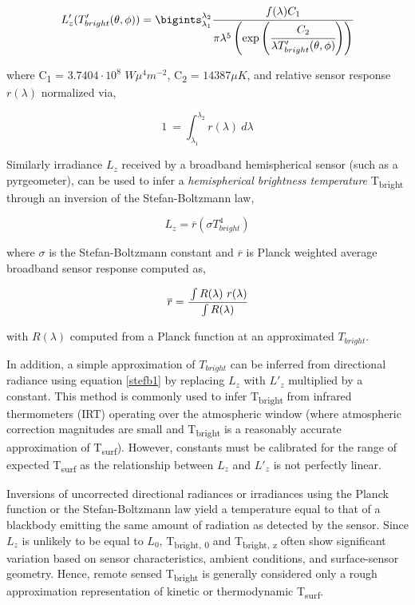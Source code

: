 \begin{equation}
L'_z(T'_{bright} (\theta, \phi)) = \bigints_{\lambda_1}^{\lambda_2} \cfrac{f(\lambda) C_1}{\pi \lambda^5 \left( \exp\left(\cfrac{C_2}{\lambda T'_{bright} (\theta, \phi)}\right)\right)}
\end{equation}

\noindent where C\textsubscript{1} = $ 3.7404 \cdot 10^8 $ $ W\mu^4 m^{-2} $, C\textsubscript{2} = $ 14387 \mu K $, and relative sensor response $ r(\lambda) $ normalized via,

\begin{equation}
1 ~ =  \int_{\lambda_1}^{\lambda_2} r(\lambda) ~ d\lambda
\end{equation}

Similarly irradiance $L_z$ received by a broadband hemispherical sensor (such as a pyrgeometer), can be used to infer a \textit{hemispherical brightness temperature} T\textsubscript{bright} through an inversion of the Stefan-Boltzmann law,

\begin{equation}
\label{stefb1}
L_z = \overline{r} (\sigma T_{bright}^4)
\end{equation}

\noindent where $ \sigma $ is the Stefan-Boltzmann constant and $ \overline{r} $ is Planck weighted average broadband sensor response computed as,

\begin{equation}
\overline{r} = \cfrac{\int R(\lambda) ~ r(\lambda)}{\int R(\lambda)}
\end{equation}

\noindent with $ R(\lambda) $ computed from a Planck function at an approximated $T_{bright}$. 

In addition, a simple approximation of $T_{bright}$ can be inferred from directional radiance using equation \ref{stefb1} by replacing $ L_z $ with $L'_z$ multiplied by a constant. This method is commonly used to infer T\textsubscript{bright} from infrared thermometers (IRT) operating over the atmospheric window (where atmospheric correction magnitudes are small and T\textsubscript{bright} is a reasonably accurate approximation of T\textsubscript{surf}). However, constants must be calibrated for the range of expected T\textsubscript{surf} as the relationship between $ L_z $ and $L'_z$  is not perfectly linear.

Inversions of uncorrected directional radiances or irradiances using the Planck function or the Stefan-Boltzmann law yield a temperature equal to that of a blackbody emitting the same amount of radiation as detected by the sensor. Since $ L_z $ is unlikely to be equal to $ L_0 $, T\textsubscript{bright, 0} and T\textsubscript{bright, z} often show significant variation based on sensor characteristics, ambient conditions, and surface-sensor geometry. Hence, remote sensed T\textsubscript{bright} is generally considered only a rough approximation representation of kinetic or thermodynamic T\textsubscript{surf}. 

